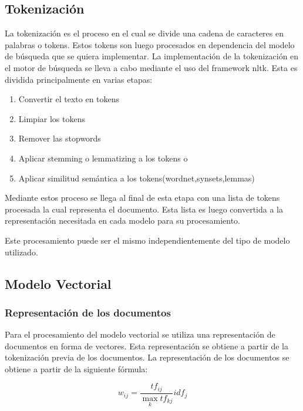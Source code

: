 \documentclass[runningheads]{llncs}
\begin{document}
\subsection{Tokenización}

La tokenización es el proceso en el cual se divide una cadena de caracteres en palabras o tokens.
Estos tokens son luego procesados en dependencia del modelo de búsqueda que se quiera implementar.
La implementación de la tokenización en el motor de búsqueda se lleva a cabo mediante el uso del
framework nltk. Esta es dividida principalmente en varias etapas:

\begin{enumerate}
    \item Convertir el texto en tokens
    \item Limpiar los tokens
    \item Remover las stopwords
    \item Aplicar stemming o lemmatizing a los tokens o
    \item Aplicar similitud semántica a los tokens(wordnet,synsets,lemmas)
\end{enumerate}

Mediante estos proceso se llega al final de esta etapa con una lista de tokens procesada la cual
representa el documento. Esta lista es luego convertida a la representación necesitada en cada modelo
para su procesamiento.

Este procesamiento puede ser el mismo independientemente del tipo de modelo utilizado.

\subsection{Modelo Vectorial}

\subsubsection{Representación de los documentos}

Para el procesamiento del modelo vectorial se utiliza una representación de documentos en forma de
vectores. Esta representación se obtiene a partir de la tokenización previa de los documentos. La
representación de los documentos se obtiene a partir de la siguiente fórmula:

\begin{equation}
    w_{ij} = \frac{tf_{ij}}{\max_{k} tf_{kj}}idf_{j}
\end{equation}
\end{document}
